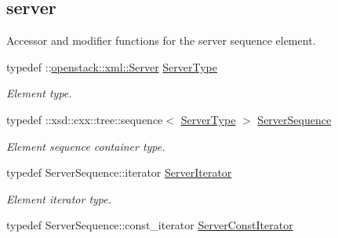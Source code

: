 \subsection*{server}
\label{_amgrpcf1e8c14e54505f60aa10ceb8d5d8ab3}
Accessor and modifier functions for the server sequence element. \begin{DoxyCompactItemize}
\item 
\hypertarget{classopenstack_1_1xml_1_1Servers_afa91afb99d4adbbfcc347f6fa3d1450e}{
typedef ::\hyperlink{classopenstack_1_1xml_1_1Server}{openstack::xml::Server} \hyperlink{classopenstack_1_1xml_1_1Servers_afa91afb99d4adbbfcc347f6fa3d1450e}{ServerType}}
\label{classopenstack_1_1xml_1_1Servers_afa91afb99d4adbbfcc347f6fa3d1450e}

\begin{DoxyCompactList}\small\item\em Element type. \item\end{DoxyCompactList}\item 
\hypertarget{classopenstack_1_1xml_1_1Servers_a9cc28e68df0ebb654db381f4bc6b43e0}{
typedef ::xsd::cxx::tree::sequence$<$ \hyperlink{classopenstack_1_1xml_1_1Server}{ServerType} $>$ \hyperlink{classopenstack_1_1xml_1_1Servers_a9cc28e68df0ebb654db381f4bc6b43e0}{ServerSequence}}
\label{classopenstack_1_1xml_1_1Servers_a9cc28e68df0ebb654db381f4bc6b43e0}

\begin{DoxyCompactList}\small\item\em Element sequence container type. \item\end{DoxyCompactList}\item 
\hypertarget{classopenstack_1_1xml_1_1Servers_a6e4be7b98b9ccec8d7b9fd3b7073f66d}{
typedef ServerSequence::iterator \hyperlink{classopenstack_1_1xml_1_1Servers_a6e4be7b98b9ccec8d7b9fd3b7073f66d}{ServerIterator}}
\label{classopenstack_1_1xml_1_1Servers_a6e4be7b98b9ccec8d7b9fd3b7073f66d}

\begin{DoxyCompactList}\small\item\em Element iterator type. \item\end{DoxyCompactList}\item 
\hypertarget{classopenstack_1_1xml_1_1Servers_af86869ba8bbdae35978d0ec2ea7ef4c3}{
typedef ServerSequence::const\_\-iterator \hyperlink{classopenstack_1_1xml_1_1Servers_af86869ba8bbdae35978d0ec2ea7ef4c3}{ServerConstIterator}}
\label{classopenstack_1_1xml_1_1Servers_af86869ba8bbdae35978d0ec2ea7ef4c3}


\end{DoxyCompactItemize}
